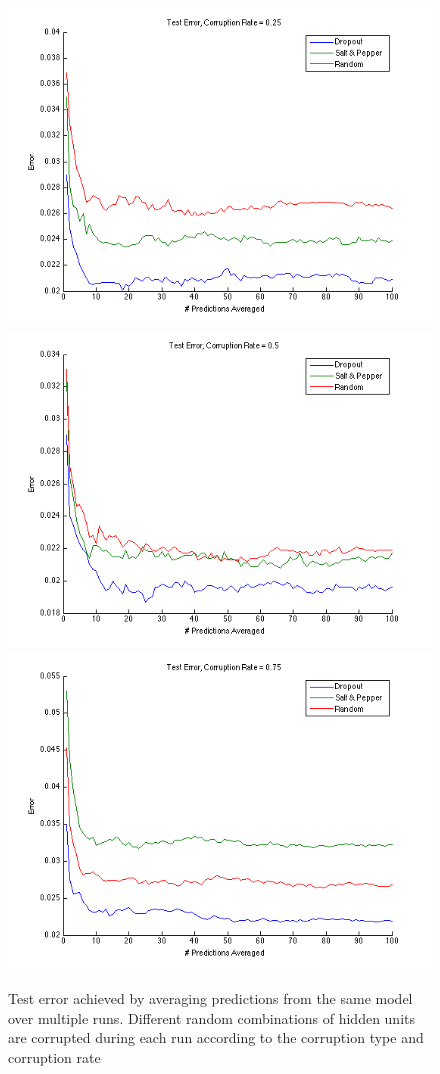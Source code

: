 \documentclass{article} %
\begin{document}
\begin{figure}[]
\centering
\begin{minipage}{.75\textwidth}
  \vspace*{\fill}
  \centering
  \includegraphics[width=.75\textwidth]{predAvg_rate=025}
  \label{fig:predAvg1}
  \includegraphics[width=.75\textwidth]{predAvg_rate=05}
  \label{fig:predAvg2}
  \includegraphics[width=.75\textwidth]{predAvg_rate=075}
  \label{fig:predAvg3}
\end{minipage}
\caption{Test error achieved by averaging predictions from the same model over multiple runs. Different random combinations of hidden units are corrupted during each run according to the corruption type and corruption rate}
\label{fig:predAvg}
\end{figure}
\end{document}
